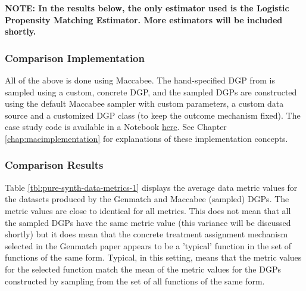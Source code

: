 \documentclass[../main.tex]{subfiles}
\begin{document}
\vspace{\baselineskip}

\textbf{NOTE: In the results below, the only estimator used is the Logistic Propensity Matching Estimator. More estimators will be included shortly.}

\subsubsection{Comparison Implementation}

All of the above is done using Maccabee. The hand-specified DGP from \textcite{Diamond2012GeneticStudies} is sampled using a custom, concrete DGP, and the sampled DGPs are constructed using the default Maccabee sampler with custom parameters, a custom data source and a customized DGP class (to keep the outcome mechanism fixed). The case study code is available in a Notebook \href{https://github.com/JoshBroomberg/Maccabee/blob/master/Notebooks/Genmatch\%20Benchmarking\%20Comparison.ipynb}{here}. See Chapter \ref{chap:macimplementation} for explanations of these implementation concepts.

\subsubsection{Comparison Results}

Table \ref{tbl:pure-synth-data-metrics-1} displays the average data metric values for the datasets produced by the Genmatch and Maccabee (sampled) DGPs. The metric values are close to identical for all metrics. This does not mean that all the sampled DGPs have the same metric value (this variance will be discussed shortly) but it does mean that the concrete treatment assignment mechanism selected in the Genmatch paper appears to be a 'typical' function in the set of functions of the same form. Typical, in this setting, means that the metric values for the selected function match the mean of the metric values for the DGPs constructed by sampling from the set of all functions of the same form.
\end{document}
